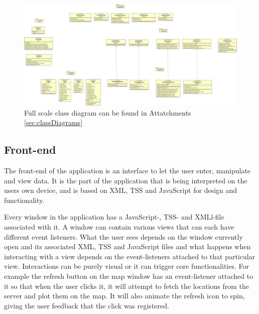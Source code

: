 \begin{figure}[!h]
\begin{center}
\includegraphics[scale=0.15]{classBack.jpg}
\caption[miniature class diagram: back-end]{Full scale class diagram can be found in Attatchments \ref{sec:classDiagrams}}
\end{center}
\end{figure}

\subsection{Front-end}
The front-end of the application is an interface to let the user enter, manipulate and view data. It is the part of the application that is being interpreted on the users own device, and is based on XML, TSS and JavaScript for design and functionality. 

Every window in the application has a JavaScript-, TSS- and XMLl-file associated with it. A window can contain various views that can each have different event listeners. What the user sees depends on the window currently open and its associated XML, TSS and JavaScript files and what happens when interacting with a view depends on the event-listeners attached to that particular view. Interactions can be purely visual or it can trigger core functionalities. For example the refresh button on the map window has an event-listener attached to it so that when the user clicks it, it will attempt to fetch the locations from the server and plot them on the map. It will also animate the refresh icon to spin, giving the user feedback that the click was registered.


